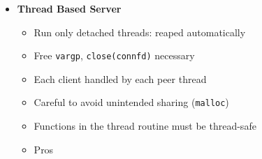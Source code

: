 \documentclass[12pt]{article}
\begin{document}
{\begin{itemize}
\begin{itemize}
\begin{itemize}
					\item \texttt{tid}: contains id of created thread
					\item \texttt{f}: thread routine
					\item \texttt{arg}: arguments for \texttt{f}
				\end{itemize}
				\item Terminating Threads
				\begin{itemize}
					\item \texttt{void pthread\_exit(void *thread\_return);}
					\item \texttt{int pthread\_cancel(pthread\_t tid);}
					\item Terminates the thread with \texttt{tid}
				\end{itemize}
				\item Reaping Threads
				\begin{itemize}
					\item \texttt{int pthread\_join(pthread\_t tid, void **thread\_return);}
					\item Blocks until thread \texttt{tid} terminates, and reaps terminated thread
					\item Can only wait for a specific thread
				\end{itemize}
				\item Detaching Threads
				\begin{itemize}
					\item Joinable thread: Can be reaped and killed by other threads, memory is not freed until reaped.
					\item Detached thread: Cannot be reaped by other threads, memory is freed automatically on termination
					\item \texttt{int pthread\_detach(pthread\_t tid);}
				\end{itemize}
			\end{itemize}
			\item \textbf{Thread Based Server}
			\begin{itemize}
				\item Run only detached threads: reaped automatically
				\item Free \texttt{vargp}, \texttt{close(connfd)} necessary
				\item Each client handled by each peer thread
				\item Careful to avoid unintended sharing (\texttt{malloc})
				\item Functions in the thread routine must be thread-safe
				\item Pros

\end{itemize}
\end{itemize}}
\end{document}
